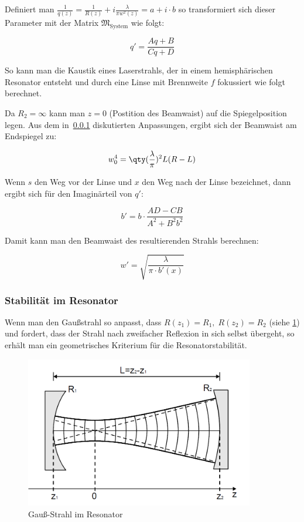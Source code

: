 \documentclass[slug=GL, room=HZDR\ Dresden/Rossendorf\,\ Geb.\ 620/123, supervisor=Tim\ Ziegler]{../../Lab_Report_LaTeX/lab_report}
\begin{document}
Definiert man \(\frac{1}{q(z)}=\frac{1}{R(z)}+i\frac{\lambda}{\pi
  w^2(z)}=a+i\cdot b\) so transformiert sich dieser Parameter mit der Matrix
\(\mathfrak{M}_{\text{System}}\) wie folgt:

\begin{equation}
  \label{eq:qtrans}
  q'=\frac{Aq + B}{Cq+D}
\end{equation}

So kann man die Kaustik eines Laserstrahls, der in einem
hemisph\"arischen Resonator entsteht und durch eine Linse mit
Brennweite \(f\) fokussiert wie folgt berechnet.

Da \(R_2=\infty\) kann man \(z=0\) (Postition des Beamwaist) auf die
Spiegelposition legen. Aus dem in~\ref{sec:stabres} diskutierten
Anpassungen, ergibt sich der Beamwaist am Endspiegel zu:

\begin{equation}
  \label{eq:konfwaist}
  w_0^4=\qty(\frac{\lambda}{\pi})^2L(R-L)
\end{equation}

Wenn \(s\) den Weg vor der Linse und \(x\) den Weg nach der Linse
bezeichnet, dann ergibt sich f\"ur den Imagin\"arteil von \(q'\):

\begin{equation}
  \label{eq:qkaust}
  b'=b\cdot\frac{AD-CB}{A^2+B^2b^2}
\end{equation}

Damit kann man den Beamwaist des resultierenden Strahls berechnen:

\begin{equation}
  \label{eq:reswaist}
  w'=\sqrt{\frac{\lambda}{\pi\cdot b'(x)}}
\end{equation}


\subsubsection{Stabilit\"at im Resonator}
\label{sec:stabres}

Wenn man den Gau\ss{}strahl so anpasst, dass \(R(z_1)=R_1,\;
R(z_2)=R_2\) (siehe \ref{fig:gauss-res}) und fordert, dass der Strahl
nach zweifacher Reflexion in sich selbst \"ubergeht, so erhält man ein
geometrisches Kriterium f\"ur die Resonatorstabilit\"at.

\begin{figure}
  \includegraphics[width=10cm]{gauss-res.png}
  \caption[Gauss]{Gau\ss{}-Strahl im Resonator}
  \label{fig:gauss-res}
\end{figure}
\end{document}
